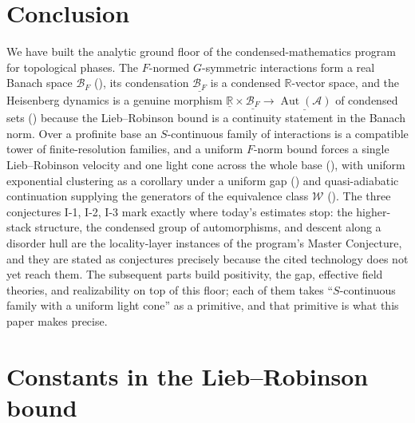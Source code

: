 \documentclass[12pt]{article}
\newcommand{\cond}[1]{\underline{#1}}          %
\newcommand{\Ffun}{F}                          %
\newcommand{\BF}{\mathcal{B}_{F}}              %
\newcommand{\Weq}{\mathcal{W}}                 %
\newcommand{\qA}{\mathcal{A}}
\newcommand{\Aut}{\operatorname{Aut}}
\newcommand{\R}{\mathbb{R}}
\theoremstyle{definition}
\theoremstyle{remark}
\begin{document}
\section{Conclusion}
\label{sec:conclusion}

We have built the analytic ground floor of the condensed-mathematics program for topological
phases. The $\Ffun$-normed $G$-symmetric interactions form a real Banach space $\BF$
(), its condensation $\cond{\BF}$ is a condensed $\R$-vector space, and the
Heisenberg dynamics is a genuine morphism $\cond{\R}\times\cond{\BF}\to\cond{\Aut(\qA)}$ of
condensed sets () because the Lieb--Robinson bound is a continuity
statement in the Banach norm. Over a profinite base an $S$-continuous family of interactions is
a compatible tower of finite-resolution families, and a uniform $\Ffun$-norm bound forces a
single Lieb--Robinson velocity and one light cone across the whole base
(), with uniform exponential clustering as a corollary under a uniform gap
() and quasi-adiabatic continuation supplying the generators of the
equivalence class $\Weq$ (). The three conjectures I-1, I-2, I-3 mark exactly
where today's estimates stop: the higher-stack structure, the condensed group of automorphisms,
and descent along a disorder hull are the locality-layer instances of the program's Master
Conjecture, and they are stated as conjectures precisely because the cited technology does not
yet reach them. The subsequent parts build positivity, the gap, effective field theories, and
realizability on top of this floor; each of them takes ``$S$-continuous family with a uniform
light cone'' as a primitive, and that primitive is what this paper makes precise.

\appendix
\section{Constants in the Lieb--Robinson bound}
\label{app:constants}
\end{document}
